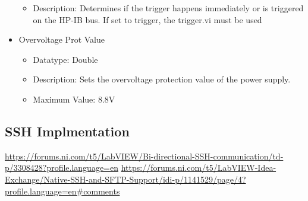 \documentclass{article}
\begin{document}
\begin{itemize}
\begin{itemize}
        \item Description: Determines if the trigger happens immediately or  is triggered on the HP-IB bus. If set to trigger, the trigger.vi must be used
    \end{itemize}
    \item Overvoltage Prot Value
    \begin{itemize}
        \item Datatype: Double
        \item Description: Sets the overvoltage protection value of the power supply.
        \item Maximum Value: 8.8V
    \end{itemize}
\end{itemize}
\subsection*{SSH Implmentation}
\begin{center}
    \url{https://forums.ni.com/t5/LabVIEW/Bi-directional-SSH-communication/td-p/3308428?profile.language=en}
    \url{https://forums.ni.com/t5/LabVIEW-Idea-Exchange/Native-SSH-and-SFTP-Support/idi-p/1141529/page/4?profile.language=en#comments}
\end{center}
\end{document}
